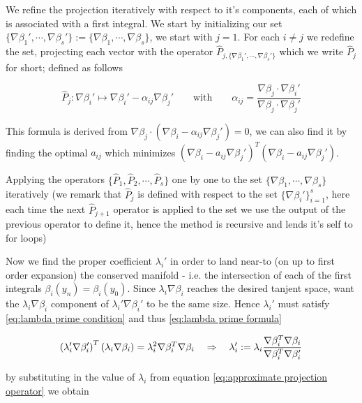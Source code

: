 \documentclass[12pt]{article}
\begin{document}
We refine the projection iteratively with respect to it's components, each of which is associated with a first integral. We start by initializing our set $\{\nabla \beta_1' ,\cdots , \nabla\beta_s'\} := \{\nabla \beta_1 ,\cdots ,\nabla \beta_s \}$, we start with $j=1$. For each $i\neq j$ we redefine the set, projecting each vector with the operator $\hat P_{j,\{\nabla\beta_1',\cdots,\nabla\beta_s'\}}$ which we write $\hat P_{j}$ for short; defined as follows

\begin{equation}\label{eq:fisrt coefficient}
    \hat P_j : \nabla\beta_i' \mapsto \nabla\beta_i' - \alpha_{ij}\nabla\beta_j' \qquad\text{with}\qquad \alpha_{ij} = \frac{\nabla\beta_j \cdot\nabla\beta_i'}{\nabla\beta_j\cdot\nabla\beta_j'} 
\end{equation}

This formula is derived from $\nabla\beta_j\cdot (\nabla\beta_i - \alpha_{ij}\nabla\beta_j')  = 0$, we can also find it by finding the optimal $a_{ij}$ which minimizes $(\nabla\beta_i - a_{ij}\nabla\beta_j')^T(\nabla\beta_i - a_{ij}\nabla\beta_j')$. 

Applying the operators $\{\hat P_1 , \hat P_2,\cdots ,\hat P_s \}$ one by one to the set $\{\nabla\beta_1,\cdots,\nabla\beta_s\}$ iteratively (we remark that $\hat P_j$ is defined with respect to the set $\{\nabla\beta_i'\}_{i=1}^s$, here each time the next $\hat P_{j+1}$ operator is applied to the set we use the output of the previous operator to define it, hence the method is recursive and lends it's self to for loops)

Now we find the proper coefficient $\lambda_i'$ in order to land near-to (on up to first order expansion) the conserved manifold - i.e. the intersection of each of the first integrals $\beta_i(y_n) = \beta_i(y_0)$. Since $\lambda_i\nabla\beta_i$ reaches the desired tanjent space, want the $\lambda_i\nabla\beta_i$ component of $\lambda_i'\nabla\beta_i'$ to be the same size. Hence $\lambda_i'$ must satisfy \eqref{eq:lambda prime condition} and thus \eqref{eq:lambda prime formula}

\begin{equation}\label{eq:lambda prime condition}
    \left( \lambda_i'\nabla\beta_i' \right)^T \left( \lambda_i\nabla\beta_i \right) = \lambda_i^2 \nabla\beta_i^T\nabla\beta_i \quad\Rightarrow\quad \lambda_i' := \lambda_i \frac{\nabla\beta_i^T \nabla\beta_i}{\nabla\beta_i^T \nabla\beta_i'}
\end{equation}

by substituting in the value of $\lambda_i$ from equation \eqref{eq:approximate projection operator} we obtain
\end{document}
